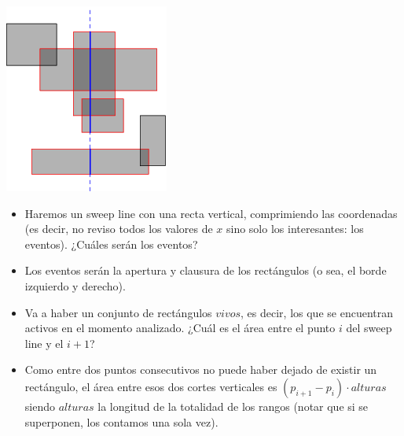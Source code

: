 \documentclass[compress]{beamer}
\begin{document}
\begin{frame}

\begin{center}
\includegraphics[scale=0.7]{images/rectangle_union.png}
\end{center}

\end{frame}

\begin{frame}

\begin{itemize}
\item Haremos un sweep line con una recta vertical, comprimiendo las coordenadas
(es decir, no reviso todos los valores de $x$ sino solo los interesantes:
los eventos). ¿Cuáles serán los eventos?
\pause
\item Los eventos serán la apertura y clausura de los rectángulos (o sea,
el borde izquierdo y derecho).
\item Va a haber un conjunto de rectángulos $vivos$, es decir, los que
se encuentran activos en el momento analizado. ¿Cuál es el área entre
el punto $i$ del sweep line y el $i+1$?
\pause
\item Como entre dos puntos consecutivos no puede haber dejado de existir
un rectángulo, el área entre esos dos cortes verticales
es $(p_{i+1} - p_i) \cdot alturas$ siendo $alturas$ la longitud
de la totalidad de los rangos (notar que si se superponen, los contamos una
sola vez).
\end{itemize}

\end{frame}
\end{document}
